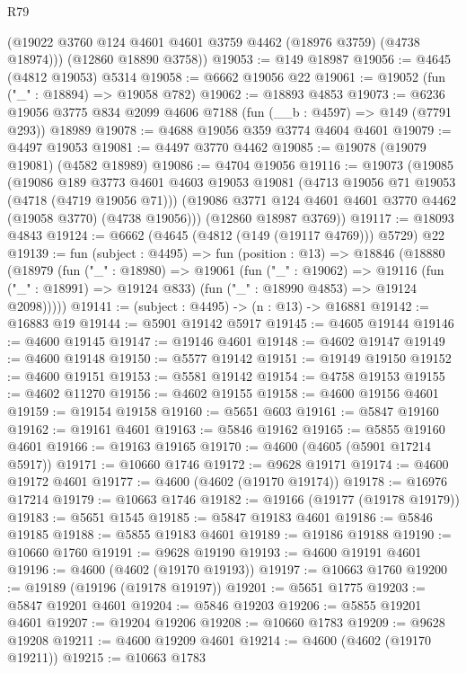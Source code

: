 \begin{lexlean}{R79}
\begin{coremodule}
        (@19022 @3760 @124 @4601 @4601 @3759 @4462 (@18976 @3759) (@4738 @18974)))
      (@12860 @18890 @3758))
@19053 := @149 @18987
@19056 := @4645 (@4812 @19053) @5314
@19058 := @6662 @19056 @22
@19061 := @19052 (fun ("_" : @18894) => @19058 @782)
@19062 := @18893 @4853
@19073 := @6236 @19056 @3775 @834 @2099 @4606 @7188 (fun (__b : @4597) => @149 (@7791 @293)) @18989
@19078 := @4688 @19056 @359 @3774 @4604 @4601
@19079 := @4497 @19053
@19081 := @4497 @3770 @4462
@19085 := @19078 (@19079 @19081) (@4582 @18989)
@19086 := @4704 @19056
@19116 := @19073
    (@19085
      (@19086
        @189
        @3773
        @4601
        @4603
        @19053
        @19081
        (@4713 @19056 @71 @19053 (@4718 (@4719 @19056 @71)))
        (@19086 @3771 @124 @4601 @4601 @3770 @4462 (@19058 @3770) (@4738 @19056)))
      (@12860 @18987 @3769))
@19117 := @18093 @4843
@19124 := @6662 (@4645 (@4812 (@149 (@19117 @4769))) @5729) @22
@19139 := fun (subject : @4495) =>
  fun (position : @13) =>
  @18846
    (@18880
      (@18979
        (fun ("_" : @18980) =>
        @19061
          (fun ("_" : @19062) =>
          @19116 (fun ("_" : @18991) => @19124 @833) (fun ("_" : @18990 @4853) => @19124 @2098)))))
@19141 := (subject : @4495) -> (n : @13) -> @16881
@19142 := @16883 @19
@19144 := @5901 @19142 @5917
@19145 := @4605 @19144
@19146 := @4600 @19145
@19147 := @19146 @4601
@19148 := @4602 @19147
@19149 := @4600 @19148
@19150 := @5577 @19142
@19151 := @19149 @19150
@19152 := @4600 @19151
@19153 := @5581 @19142
@19154 := @4758 @19153
@19155 := @4602 @11270
@19156 := @4602 @19155
@19158 := @4600 @19156 @4601
@19159 := @19154 @19158
@19160 := @5651 @603
@19161 := @5847 @19160
@19162 := @19161 @4601
@19163 := @5846 @19162
@19165 := @5855 @19160 @4601
@19166 := @19163 @19165
@19170 := @4600 (@4605 (@5901 @17214 @5917))
@19171 := @10660 @1746
@19172 := @9628 @19171
@19174 := @4600 @19172 @4601
@19177 := @4600 (@4602 (@19170 @19174))
@19178 := @16976 @17214
@19179 := @10663 @1746
@19182 := @19166 (@19177 (@19178 @19179))
@19183 := @5651 @1545
@19185 := @5847 @19183 @4601
@19186 := @5846 @19185
@19188 := @5855 @19183 @4601
@19189 := @19186 @19188
@19190 := @10660 @1760
@19191 := @9628 @19190
@19193 := @4600 @19191 @4601
@19196 := @4600 (@4602 (@19170 @19193))
@19197 := @10663 @1760
@19200 := @19189 (@19196 (@19178 @19197))
@19201 := @5651 @1775
@19203 := @5847 @19201 @4601
@19204 := @5846 @19203
@19206 := @5855 @19201 @4601
@19207 := @19204 @19206
@19208 := @10660 @1783
@19209 := @9628 @19208
@19211 := @4600 @19209 @4601
@19214 := @4600 (@4602 (@19170 @19211))
@19215 := @10663 @1783

\end{coremodule}
\end{lexlean}
